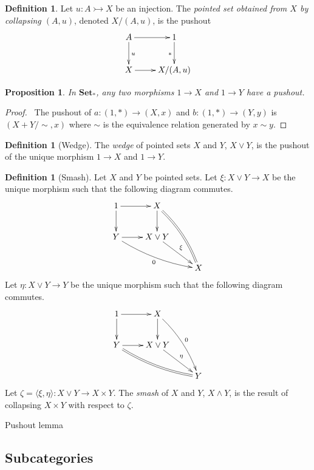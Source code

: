 \documentclass{book}
\let\qed\relax
\newtheorem{prop}[ax]{Proposition}
\theoremstyle{definition}
\newtheorem{df}[ax]{Definition}
\begin{document}
\begin{df}
Let $u : A \rightarrowtail X$ be an injection. The \emph{pointed set obtained from $X$ by collapsing $(A,u)$}, denoted $X / (A,u)$, is the pushout
\[ \xymatrix{
A \ar[r] \ar[d]^u & 1 \ar[d]_{*} \\
X \ar[r] & X / (A,u)
} \]
\end{df}

\begin{prop}
In $\mathbf{Set}_*$, any two morphisms $1 \rightarrow X$ and $1 \rightarrow Y$ have a pushout.
\end{prop}

\begin{proof}
\pf\ The pushout of $a : (1,*) \rightarrow (X,x)$ and $b : (1,*) \rightarrow (Y,y)$ is $(X+Y/\sim, x)$ where $\sim$ is the equivalence relation generated by $x \sim y$. \qed
\end{proof}

\begin{df}[Wedge]
The \emph{wedge} of pointed sets $X$ and $Y$, $X \vee Y$, is the pushout of the unique morphism $1 \rightarrow X$ and $1 \rightarrow Y$.
\end{df}

\begin{df}[Smash]
Let $X$ and $Y$ be pointed sets. Let $\xi : X \vee Y \rightarrow X$ be the unique morphism such that the following diagram commutes.
\[ \xymatrix{
1 \ar[r] \ar[d] & X \ar[d] \ar@{=}@/^/[ddr] \\
Y \ar[r] \ar@/_/[drr]_0 & X \vee Y \ar[dr]^\xi \\
& & X
} \]
Let $\eta : X \vee Y \rightarrow Y$ be the unique morphism such that the following diagram commutes.
\[ \xymatrix{
1 \ar[r] \ar[d] & X \ar[d] \ar@/^/[ddr]^0 \\
Y \ar[r] \ar@{=}@/_/[drr] & X \vee Y \ar[dr]^\eta \\
& & Y
} \]
Let $\zeta = \langle \xi, \eta \rangle : X \vee Y \rightarrow X \times Y$. The \emph{smash} of $X$ and $Y$, $X \wedge Y$, is the result of collapsing $X \times Y$ with respect to $\zeta$.
\end{df}

Pushout lemma

\subsection{Subcategories}
\end{document}
